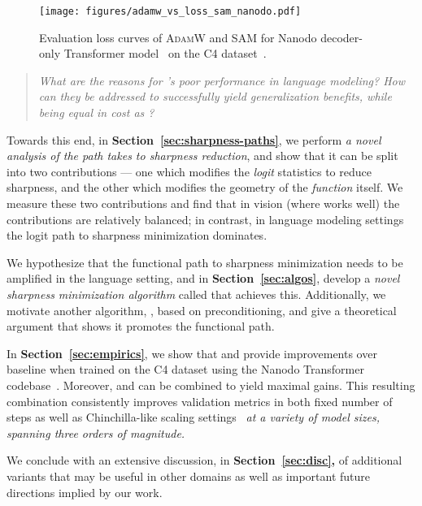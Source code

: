 \begin{figure}[ht]
\begin{center}
\centerline{\texttt{[image: figures/adamw\_vs\_loss\_sam\_nanodo.pdf]}}
\caption{Evaluation loss curves of \textcolor{adamwColor}{\textsc{AdamW}} and \textcolor{samColor}{\textsc{SAM}} for Nanodo decoder-only Transformer model~\citep{nanodo} on the C4 dataset~\citep{raffel2020exploring}.
}
\label{fig:sam-adamw-loss-curve}
\end{center}
\vskip -0.4in
\end{figure}
\begin{quote}
    \textit{What are the reasons for  \SAM's poor performance in language modeling? How can they be addressed to successfully yield generalization benefits, while being equal in cost as \SAM? }
\end{quote}
Towards this end,   in \textbf{Section~\ref{sec:sharpness-paths}}, we perform \textit{a novel analysis of the path \SAM takes to sharpness reduction}, and show that it can be split into two contributions --- one which
modifies the \emph{logit} statistics to reduce sharpness, and the other which modifies the geometry of the \emph{function} itself. We measure
these two contributions and find that in vision (where \SAM works well) the contributions are relatively balanced; in contrast,
in language modeling settings the logit path to sharpness minimization dominates.

 We hypothesize that the functional path to sharpness minimization needs to be amplified in the language setting, and in \textbf{Section~\ref{sec:algos}}, develop 
a \textit{novel sharpness minimization algorithm} called \funcSAM that achieves this. 
Additionally, we motivate another algorithm, \precondSAM, based on preconditioning, and give a theoretical argument that shows it  promotes the functional path.

In \textbf{Section~\ref{sec:empirics}}, we show that \funcSAM and \precondSAM provide improvements over baseline  \adamw when trained on the C4 dataset using the Nanodo Transformer
codebase~\citep{nanodo}. Moreover, \funcSAM and \precondSAM can be combined to yield maximal gains.
This resulting combination consistently improves validation metrics in both fixed number of steps as well as Chinchilla-like scaling settings~\citep{hoffmann2022trainingcomputeoptimallargelanguage} \textit{at a variety of model sizes, spanning three orders of magnitude.} 

We conclude with an extensive discussion, in \textbf{Section~\ref{sec:disc},} of additional \SAM variants that may be useful in other domains as well as important future directions implied by our work.















